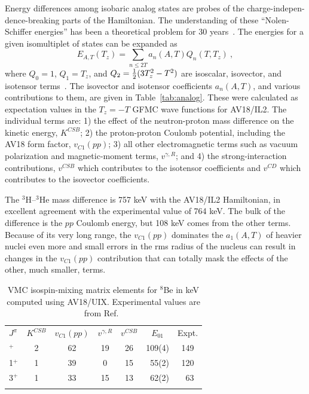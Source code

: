 Energy differences among isobaric analog states are probes of the
charge-indepen-dence-breaking parts of the Hamiltonian.
The understanding of these ``Nolen-Schiffer energies'' has been
a theoretical problem for 30 years~\cite{NS69}.
The energies for a given isomultiplet of states can be expanded as
\begin{equation}
   E_{A,T}(T_z) = \sum_{n\leq 2T} a_n(A,T) Q_n(T,T_z) \ ,
\label{eq:isoexpand}
\end{equation}
where $Q_0=1$, $Q_1=T_z$, and $Q_2=\textstyle{1\over2}(3T_z^2-T^2)$ are
isoscalar, isovector, and isotensor terms~\cite{P60}.
The isovector and isotensor coefficients $a_n(A,T)$, and various
contributions to them, are given in Table~\ref{tab:analog}.  
These were calculated as
expectation values in the $T_z=-T$ GFMC wave functions for AV18/IL2.
The individual terms are: 1) the effect of the neutron-proton mass
difference on the kinetic energy, $K^{CSB}$; 2) the proton-proton
Coulomb potential, including the AV18 form factor, $v_{C1}(pp)$; 
3) all other electromagnetic terms such as vacuum polarization
and magnetic-moment terms, $v^{\gamma,R}$; and
4) the strong-interaction contributions, $v^{CSB}$ which contributes
to the isotensor coefficients and $v^{CD}$ which contributes to
the isovector coefficients.

The $^3$H--$^3$He mass difference is 757 keV with the AV18/IL2 Hamiltonian,
in excellent agreement with the experimental value of 764 keV.
The bulk of the difference is the $pp$ Coulomb energy, but 108 keV
comes from the other terms.
Because of its very long range, the $v_{C1}(pp)$ dominates the $a_1(A,T)$
of heavier nuclei even more and small errors in the rms radius of the
nucleus can result in changes in the $v_{C1}(pp)$ contribution that
can totally mask the effects of the other, much smaller, terms.

\begin{table}
\caption{VMC isospin-mixing matrix elements for $^8$Be in keV computed
using AV18/UIX.  Experimental values are from Ref.~\protect\cite{B66}}
\begin{tabular}{lcccccc}
\toprule
$J^{\pi}$ & $K^{CSB}$& $v_{C1}(pp)$ & $v^{\gamma,R}$ & $v^{CSB}$  & $E_{01}$ & Expt. \\
\colrule
2$^+$     &       2  &      62    &      19  &      26    &  109(4)  &   149  \\
1$^+$     &       1  &      39    &       0  &      15    &  ~55(2)  &   120  \\
3$^+$     &       1  &      33    &      15  &      13    &  ~62(2)  &   ~63  \\
\botrule
\end{tabular}
\label{table:mixing}
\end{table}


